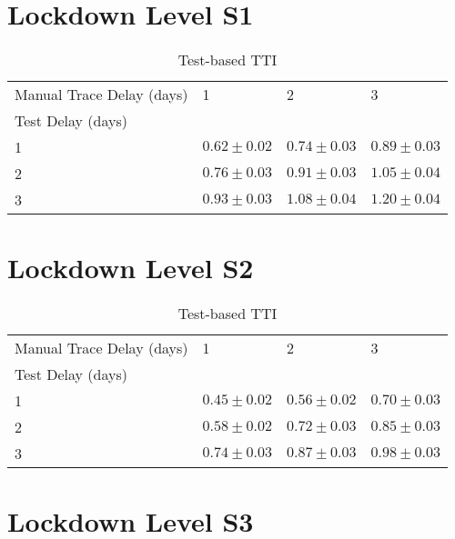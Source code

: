 \documentclass{article}
\begin{document}
    

\section{Lockdown Level S1}


    \begin{table}[H]
         \begin{tabular}{llll}
\toprule
Manual Trace Delay (days) &                1 &                2 &                3 \\
Test Delay (days) &                  &                  &                  \\
\midrule
1                 &  $0.62 \pm 0.02$ &  $0.74 \pm 0.03$ &  $0.89 \pm 0.03$ \\
2                 &  $0.76 \pm 0.03$ &  $0.91 \pm 0.03$ &  $1.05 \pm 0.04$ \\
3                 &  $0.93 \pm 0.03$ &  $1.08 \pm 0.04$ &  $1.20 \pm 0.04$ \\
\bottomrule
\end{tabular}

        \caption{Test-based TTI}
    \end{table}
    

\clearpage

\section{Lockdown Level S2}


    \begin{table}[H]
         \begin{tabular}{llll}
\toprule
Manual Trace Delay (days) &                1 &                2 &                3 \\
Test Delay (days) &                  &                  &                  \\
\midrule
1                 &  $0.45 \pm 0.02$ &  $0.56 \pm 0.02$ &  $0.70 \pm 0.03$ \\
2                 &  $0.58 \pm 0.02$ &  $0.72 \pm 0.03$ &  $0.85 \pm 0.03$ \\
3                 &  $0.74 \pm 0.03$ &  $0.87 \pm 0.03$ &  $0.98 \pm 0.03$ \\
\bottomrule
\end{tabular}

        \caption{Test-based TTI}
    \end{table}
    

\clearpage

\section{Lockdown Level S3}
\end{document}
